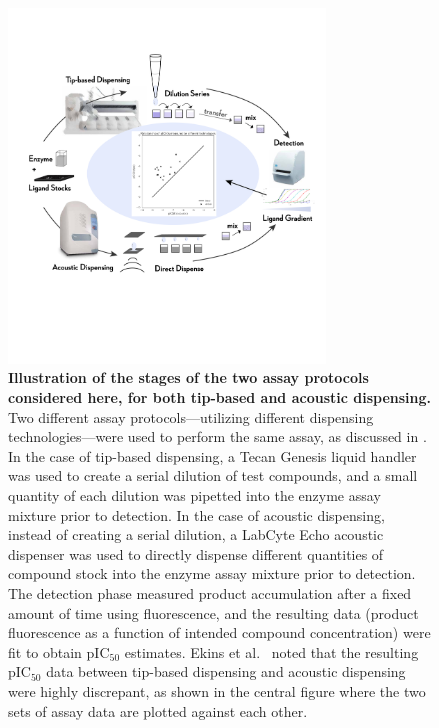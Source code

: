 \documentclass[aps,pre,twocolumn,nofootinbib,superscriptaddress,linenumbers]{revtex4-1}
\begin{document}
\begin{figure}[tb]
   \includegraphics[trim={0 15cm 0 8cm},clip,width=0.75\textwidth]{../figures/Fig1-4.pdf}
  \caption{{\bf Illustration of the stages of the two assay protocols considered here, for both tip-based and acoustic dispensing.}
  Two different assay protocols---utilizing different dispensing technologies---were used to perform the same assay, as discussed in \citep{ekins_dispensing_2013}.
  In the case of tip-based dispensing, a Tecan Genesis liquid handler was used to create a serial dilution of test compounds, and a small quantity of each dilution was pipetted into the enzyme assay mixture prior to detection.
  In the case of acoustic dispensing, instead of creating a serial dilution, a LabCyte Echo acoustic dispenser was used to directly dispense different quantities of compound stock into the enzyme assay mixture prior to detection.
  The detection phase measured product accumulation after a fixed amount of time using fluorescence, and the resulting data (product fluorescence as a function of intended compound concentration) were fit to obtain pIC$_{50}$ estimates.
  Ekins et al.~\citep{ekins_dispensing_2013} noted that the resulting pIC$_{50}$ data between tip-based dispensing and acoustic dispensing were highly discrepant, as shown in the central figure where the two sets of assay data are plotted against each other.
   }
  \label{fig:overview}
\end{figure}


\end{document}
